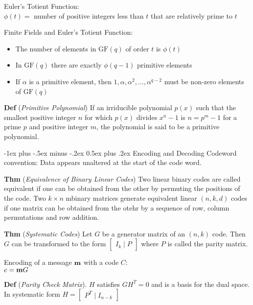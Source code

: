 \documentclass[12pt,landscape]{article}
\makeatletter
\renewcommand{\section}{\@startsection{section}{1}{0mm}%
                                {-1ex plus -.5ex minus -.2ex}%
                                {0.5ex plus .2ex}%
                                {\normalfont\normalsize\bfseries}}
\newcommand{\tab}{\hspace{.02\textwidth}}
\newcommand{\defn}[1]{\textbf{Def} (\emph{#1})}
\newcommand{\thm}[1]{\textbf{Thm} (\emph{#1})}
\newcommand{\gf}[1]{\text{GF}(#1)}
\makeatother
\begin{document}
\begin{multicols*}{3}
Euler's Totient Function:\\
\tab $\phi(t) =$ number of positive integers less than $t$ that are relatively prime to $t$

Finite Fields and Euler's Totient Function:\\
\vspace{-0.5em}
\begin{itemize}[itemsep=0em]
    \item The number of elements in $\gf{q}$ of order $t$ is $\phi(t)$
    \item In $\gf{q}$ there are exactly $\phi(q - 1)$ primitive elements
    \item If $\alpha$ is a primitive element, then $1, \alpha, \alpha^2, \ldots, \alpha^{q-2}$ must be non-zero elements of $\gf{q}$
\end{itemize}

\defn{Primitive Polynomial} If an irriducible polynomial $p(x)$ such that the smallest positive integer $n$ for which $p(x)$ divides $x^n - 1$ is $n=p^m - 1$ for a prime $p$ and positive integer $m$, the polynomial is said to be a primitive polynomial.

\section{Encoding and Decoding}
Codeword convention: Data appears unaltered at the start of the code word.

\thm{Equivalence of Binary Linear Codes} Two linear binary codes are called equivalent if one can be obtained from the other by permuting the positions of the code. Two $k\times n$ mbinary matrices generate equivalent linear $(n,k,d)$ codes if one matrix can be obtained from the otehr by a sequence of row, column permutations and row addition.

\thm{Systematic Codes} Let $G$ be a generator matrix of an $(n,k)$ code. Then $G$ can be transformed to the form $\begin{bmatrix}
	I_k \mid P
\end{bmatrix}$ where $P$ is called the parity matrix.

Encoding of a message $\vb{m}$ with a code $C$:\\
\tab $c = \vb{m}G$

\defn{Parity Check Matrix}. $H$ satisfies $GH^T = 0$ and is a basis for the dual space. In systematic form $H = \begin{bmatrix}
	P^T \mid I_{n-k}
\end{bmatrix}$


\end{multicols*}
\end{document}
